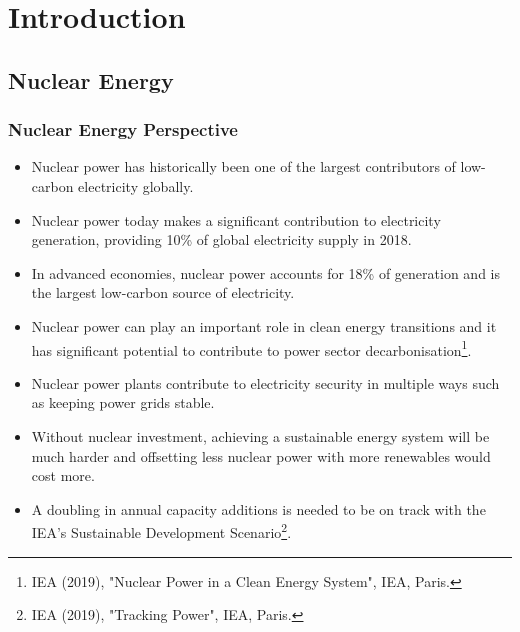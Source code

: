 \section{Introduction}
\subsection{Nuclear Energy}
\frame
{
  \frametitle{Nuclear Energy Perspective}
	\begin{itemize}
		\item Nuclear power has historically been one of the largest contributors of low-carbon electricity globally.
		\item Nuclear power today makes a significant contribution to electricity generation, providing 10\% of global electricity supply in 2018.
		\item In advanced economies, nuclear power accounts for 18\% of generation and is the largest low-carbon source of electricity.
		\item Nuclear power can play an important role in clean energy transitions and it has significant potential to contribute to power sector decarbonisation\footnote{ IEA (2019), "Nuclear Power in a Clean Energy System", IEA, Paris.}.
		\item Nuclear power plants contribute to electricity security in multiple ways such as keeping power grids stable.
		\item Without nuclear investment, achieving a sustainable energy system will be much harder and offsetting less nuclear power with more renewables would cost more.
		\item A doubling in annual capacity additions is needed to be on track with the IEA's Sustainable Development Scenario\footnote{ IEA (2019), "Tracking Power", IEA, Paris.}.
	\end{itemize}
}

